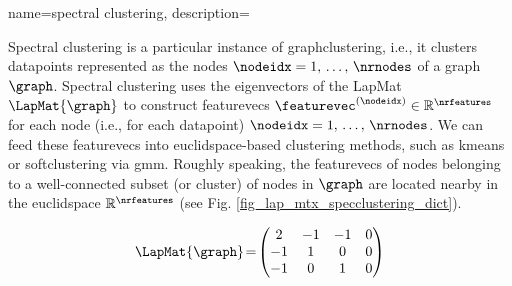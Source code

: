 {name={spectral clustering},
	description={Spectral \gls{clustering} is a particular instance of 
		\gls{graphclustering}, i.e., it clusters \glspl{datapoint} 
		represented as the nodes $\nodeidx=1, \,\ldots, \,\nrnodes$ of a \gls{graph} $\graph$. 
		Spectral \gls{clustering} uses the \glspl{eigenvector} of the \gls{LapMat} $\LapMat{\graph}$ 
		to construct \glspl{featurevec} $\featurevec^{(\nodeidx)} \in \mathbb{R}^{\nrfeatures}$ 
		for each node (i.e., for each \gls{datapoint}) $\nodeidx=1, \,\ldots, \,\nrnodes$. We can feed these \glspl{featurevec} 
		into \gls{euclidspace}-based \gls{clustering} methods, such as \gls{kmeans} 
		or \gls{softclustering} via \gls{gmm}. Roughly speaking, the \glspl{featurevec} of nodes 
		belonging to a well-connected subset (or \gls{cluster}) of nodes in $\graph$ are located 
		nearby in the \gls{euclidspace} $\mathbb{R}^{\nrfeatures}$ (see Fig. \ref{fig_lap_mtx_specclustering_dict}). 
		\begin{figure}[H]
			\begin{center}
				\begin{minipage}{0.4\textwidth}
				\end{minipage} 
				\hspace*{5mm}
				\begin{minipage}{0.4\textwidth}
					\begin{equation} 
						\LapMat{\graph}\!=\!
						\begin{pmatrix} 
							2 & -1 & -1 & 0 \\ 
							-1 & 1 & 0 & 0 \\  
							-1 & 0 & 1 & 0 \\ 

\end{pmatrix}
\end{equation}
\end{minipage}
\end{center}
\end{figure}}}

